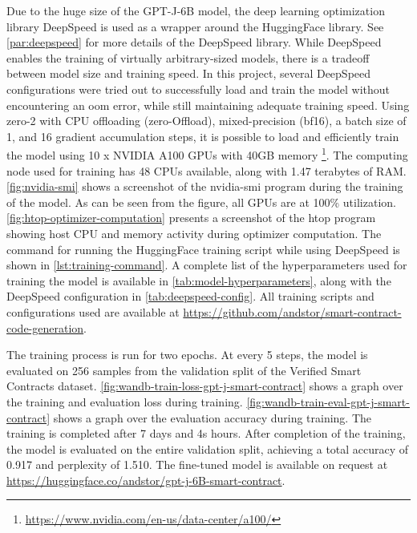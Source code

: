 Due to the huge size of the GPT-J-6B model, the deep learning optimization library DeepSpeed \cite{deepspeed} is used as a wrapper around the HuggingFace library. See \cref{par:deepspeed} for more details of the DeepSpeed library. While DeepSpeed enables the training of virtually arbitrary-sized models, there is a tradeoff between model size and training speed. In this project, several DeepSpeed configurations were tried out to successfully load and train the model without encountering an \acrfull{oom} error, while still maintaining adequate training speed. Using \acrshort{zero}-2 with CPU offloading (\acrshort{zero}-Offload), mixed-precision (\acrshort{bf16}), a batch size of 1, and 16 gradient accumulation steps, it is possible to load and efficiently train the model using 10 x NVIDIA A100 GPUs with 40GB memory \footnote{\url{https://www.nvidia.com/en-us/data-center/a100/}}. The computing node used for training has 48 CPUs available, along with 1.47 terabytes of RAM. \cref{fig:nvidia-smi} shows a screenshot of the nvidia-smi program during the training of the model. As can be seen from the figure, all GPUs are at 100\% utilization. \cref{fig:htop-optimizer-computation} presents a screenshot of the htop program showing host CPU and memory activity during optimizer computation. The command for running the HuggingFace training script while using DeepSpeed is shown in \cref{lst:training-command}. A complete list of the hyperparameters used for training the model is available in \cref{tab:model-hyperparameters}, along with the DeepSpeed configuration in \cref{tab:deepspeed-config}. All training scripts and configurations used are available at \url{https://github.com/andstor/smart-contract-code-generation}.

The training process is run for two epochs. At every 5 steps, the model is evaluated on 256 samples from the validation split of the Verified Smart Contracts dataset. \cref{fig:wandb-train-loss-gpt-j-smart-contract} shows a graph over the training and evaluation loss during training. \cref{fig:wandb-train-eval-gpt-j-smart-contract} shows a graph over the evaluation accuracy during training. The training is completed after 7 days and 4s hours. After completion of the training, the model is evaluated on the entire validation split, achieving a total accuracy of 0.917 and perplexity of 1.510. The fine-tuned model is available on request at \url{https://huggingface.co/andstor/gpt-j-6B-smart-contract}.

